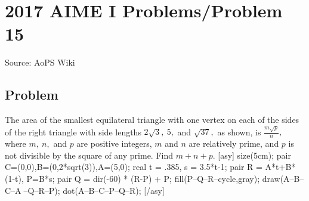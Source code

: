 \documentclass[12pt]{article}
\begin{document}
\section*{{2017 AIME I Problems/Problem 15}}
Source: AoPS Wiki

\subsection*{Problem}
The area of the smallest equilateral triangle with one vertex on each of the sides of the right triangle with side lengths $2\sqrt{3},~5,$ and $\sqrt{37},$ as shown, is $\frac{m\sqrt{p}}{n},$ where $m,~n,$ and $p$ are positive integers, $m$ and $n$ are relatively prime, and $p$ is not divisible by the square of any prime. Find $m+n+p.$ [asy] size(5cm); pair C=(0,0),B=(0,2*sqrt(3)),A=(5,0); real t = .385, s = 3.5*t-1; pair R = A*t+B*(1-t), P=B*s; pair Q = dir(-60) * (R-P) + P; fill(P--Q--R--cycle,gray); draw(A--B--C--A^^P--Q--R--P); dot(A--B--C--P--Q--R); [/asy]
\end{document}
